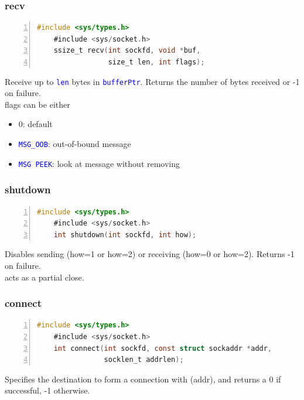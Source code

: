\documentclass[12pt]{beamer}
\begin{document}
\begin{frame}[fragile]
	\frametitle{recv}
	{\tiny
	\begin{lstlisting}[language=C, breaklines=true, commentstyle=\color{mygreen},frame=lrtb,  rulecolor=\color{black}, numbers=left,  numbersep=5pt, numberstyle=\tiny\color{mygray}]
	#include <sys/types.h>
	#include <sys/socket.h>
	ssize_t recv(int sockfd, void *buf, 
	             size_t len, int flags);
	\end{lstlisting}}
	{\footnotesize
	Receive up to \texttt{\textcolor{blue}{len}} bytes in \texttt{\textcolor{blue}{bufferPtr}}. Returns the number of bytes received or -1 on failure. \\ flags can be either

	\begin{itemize}
	\item 0: default
	\item \texttt{\textcolor{blue}{MSG\_OOB}}:  out-of-bound message
	\item \texttt{\textcolor{blue}{MSG PEEK}}: look at message without removing
	\end{itemize}
	}
\end{frame}

\begin{frame}[fragile]
	\frametitle{shutdown}
	{\tiny
	\begin{lstlisting}[language=C, breaklines=true, commentstyle=\color{mygreen},frame=lrtb,  rulecolor=\color{black}, numbers=left,  numbersep=5pt, numberstyle=\tiny\color{mygray}]
	#include <sys/types.h>
	#include <sys/socket.h>
	int shutdown(int sockfd, int how);
	\end{lstlisting}}
	{\footnotesize
	Disables sending (how=1 or how=2) or receiving (how=0 or how=2). Returns -1 on failure. \\ acts as a partial close.
	}
\end{frame}

\begin{frame}[fragile]
	\frametitle{connect}
	{\tiny
	\begin{lstlisting}[language=C, breaklines=true, commentstyle=\color{mygreen},frame=lrtb,  rulecolor=\color{black}, numbers=left,  numbersep=5pt, numberstyle=\tiny\color{mygray}]
	#include <sys/types.h>
	#include <sys/socket.h>
	int connect(int sockfd, const struct sockaddr *addr,
	            socklen_t addrlen);
	\end{lstlisting}}
	{\footnotesize
	Specifies the destination to form a connection with (addr), and returns a 0 if successful, -1 otherwise.
	}
\end{frame}	
\end{document}
